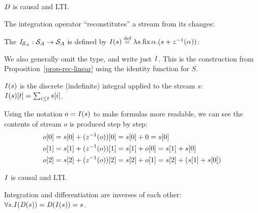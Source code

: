 \begin{proposition}
\label{prop-diff-properties}
$\mathit{D}$ is causal and LTI.
\end{proposition}

The integration operator ``reconstitutes'' a stream from its changes:

\begin{definition}[Integration]
The   $\mathit{I}_{\mathcal{S}_{A}} : \mathcal{S}_{A} \to \mathcal{S}_{A}$
is defined by $\mathit{I}(s) \stackrel{\textrm{\scriptsize def}}{=} \lambda s . \mbox{fix}\,\alpha.(s + z^{-1}(\alpha))$:
\begin{center}
\end{center}
\end{definition}

\noindent
We also generally omit the type, and write just $\mathit{I}$.
This is the construction from Proposition~\ref{prop-rec-linear}
using the identity function for $S$.

\begin{proposition}
$\mathit{I}(s)$ is the discrete (indefinite) integral applied to the stream $s$:
$\mathit{I}(s)[t] = \sum_{i \leq t} s[i]$.
\end{proposition}

Using the notation $o = \mathit{I}(s)$ to make formulas more readable, we can
see the contents of stream $o$ is produced step by step:
\begin{align*}
  o[0] &= s[0] + (z^{-1}(o))[0] = s[0] + 0 = s[0] \\
  o[1] &= s[1] + (z^{-1}(o))[1] = s[1] + o[0] = s[1] + s[0] \\
  o[2] &= s[2] + (z^{-1}(o))[2] = s[2] + o[1] = s[2] + (s[1] + s[0])
\end{align*}

\begin{proposition}
\label{prop-integ-properties}
$\mathit{I}$ is causal and LTI.
\end{proposition}

\begin{theorem}[Inversion]
\label{inverses}
Integration and differentiation are inverses of each other:
$\forall s . \mathit{I}(\mathit{D}(s)) = \mathit{D}(\mathit{I}(s)) = s$.
\end{theorem}

